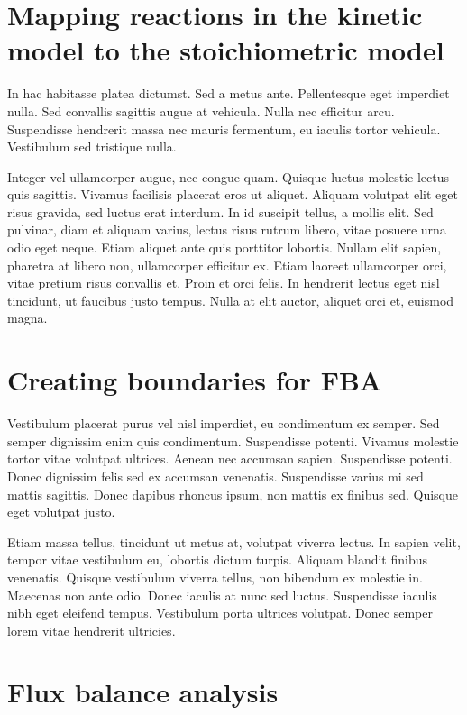 \documentclass[parskip=full]{scrreprt}
\begin{document}
\section{Mapping reactions in the kinetic model to the stoichiometric model}
\label{sec:mapping}

In hac habitasse platea dictumst. Sed a metus ante. Pellentesque eget imperdiet nulla. Sed convallis sagittis augue at vehicula. Nulla nec efficitur arcu. Suspendisse hendrerit massa nec mauris fermentum, eu iaculis tortor vehicula. Vestibulum sed tristique nulla.

Integer vel ullamcorper augue, nec congue quam. Quisque luctus molestie lectus quis sagittis. Vivamus facilisis placerat eros ut aliquet. Aliquam volutpat elit eget risus gravida, sed luctus erat interdum. In id suscipit tellus, a mollis elit. Sed pulvinar, diam et aliquam varius, lectus risus rutrum libero, vitae posuere urna odio eget neque. Etiam aliquet ante quis porttitor lobortis. Nullam elit sapien, pharetra at libero non, ullamcorper efficitur ex. Etiam laoreet ullamcorper orci, vitae pretium risus convallis et. Proin et orci felis. In hendrerit lectus eget nisl tincidunt, ut faucibus justo tempus. Nulla at elit auctor, aliquet orci et, euismod magna.

\section{Creating boundaries for FBA}
\label{sec:bounds}

Vestibulum placerat purus vel nisl imperdiet, eu condimentum ex semper. Sed semper dignissim enim quis condimentum. Suspendisse potenti. Vivamus molestie tortor vitae volutpat ultrices. Aenean nec accumsan sapien. Suspendisse potenti. Donec dignissim felis sed ex accumsan venenatis. Suspendisse varius mi sed mattis sagittis. Donec dapibus rhoncus ipsum, non mattis ex finibus sed. Quisque eget volutpat justo.

Etiam massa tellus, tincidunt ut metus at, volutpat viverra lectus. In sapien velit, tempor vitae vestibulum eu, lobortis dictum turpis. Aliquam blandit finibus venenatis. Quisque vestibulum viverra tellus, non bibendum ex molestie in. Maecenas non ante odio. Donec iaculis at nunc sed luctus. Suspendisse iaculis nibh eget eleifend tempus. Vestibulum porta ultrices volutpat. Donec semper lorem vitae hendrerit ultricies.

\section{Flux balance analysis}
\label{sec:fba}
\end{document}
